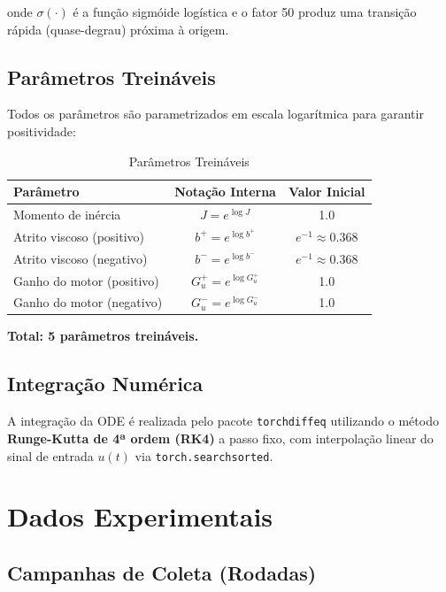 \documentclass[11pt,a4paper]{article}
\begin{document}
onde $\sigma(\cdot)$ é a função sigmóide logística e o fator 50 produz uma transição rápida (quase-degrau) próxima à origem.

\subsection{Parâmetros Treináveis}

Todos os parâmetros são parametrizados em escala logarítmica para garantir positividade:

\begin{table}[hbt!]
\centering
\caption{Parâmetros Treináveis}
\vspace{0.2cm}
\begin{tabular}{lcc}
\toprule
\textbf{Parâmetro} & \textbf{Notação Interna} & \textbf{Valor Inicial} \\
\midrule
Momento de inércia & $J = e^{\log J}$ & 1.0 \\
Atrito viscoso (positivo) & $b^+ = e^{\log b^+}$ & $e^{-1} \approx 0.368$ \\
Atrito viscoso (negativo) & $b^- = e^{\log b^-}$ & $e^{-1} \approx 0.368$ \\
Ganho do motor (positivo) & $G_u^+ = e^{\log G_u^+}$ & 1.0 \\
Ganho do motor (negativo) & $G_u^- = e^{\log G_u^-}$ & 1.0 \\
\bottomrule
\end{tabular}
\end{table}

\textbf{Total: 5 parâmetros treináveis.}

\subsection{Integração Numérica}

A integração da ODE é realizada pelo pacote \texttt{torchdiffeq} utilizando o método \textbf{Runge-Kutta de 4ª ordem (RK4)} a passo fixo, com interpolação linear do sinal de entrada $u(t)$ via \texttt{torch.searchsorted}.

\section{Dados Experimentais}

\subsection{Campanhas de Coleta (Rodadas)}
\end{document}
